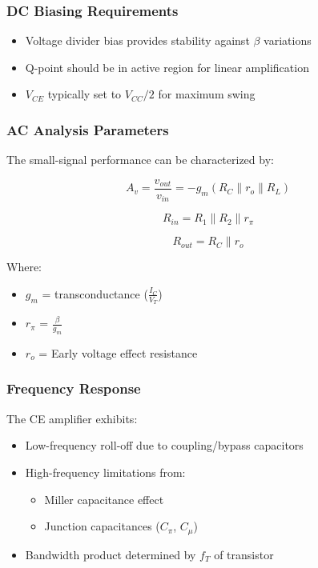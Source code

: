 \documentclass[conference]{IEEEtran}
\begin{document}
\subsubsection{DC Biasing Requirements}
\begin{itemize}
    \item Voltage divider bias provides stability against $\beta$ variations
    \item Q-point should be in active region for linear amplification
    \item $V_{CE}$ typically set to $V_{CC}/2$ for maximum swing
\end{itemize}

\subsubsection{AC Analysis Parameters}
The small-signal performance can be characterized by:

\begin{equation}
A_v = \frac{v_{out}}{v_{in}} = -g_m(R_C \parallel r_o \parallel R_L)
\end{equation}

\begin{equation}
R_{in} = R_1 \parallel R_2 \parallel r_{\pi}
\end{equation}

\begin{equation}
R_{out} = R_C \parallel r_o
\end{equation}

Where:
\begin{itemize}
    \item $g_m$ = transconductance ($\frac{I_C}{V_T}$)
    \item $r_{\pi}$ = $\frac{\beta}{g_m}$
    \item $r_o$ = Early voltage effect resistance
\end{itemize}

\subsubsection{Frequency Response}
The CE amplifier exhibits:
\begin{itemize}
    \item Low-frequency roll-off due to coupling/bypass capacitors
    \item High-frequency limitations from:
    \begin{itemize}
        \item Miller capacitance effect
        \item Junction capacitances ($C_{\pi}$, $C_{\mu}$)
    \end{itemize}
    \item Bandwidth product determined by $f_T$ of transistor
\end{itemize}
\end{document}
